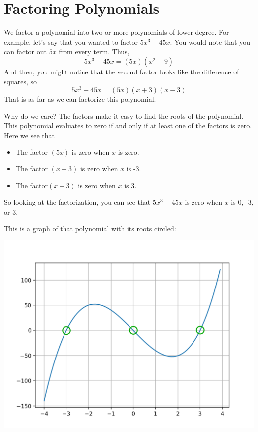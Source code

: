 \chapter{Factoring Polynomials}

We factor a polynomial into two or more polynomials of lower
degree. For example, let's say that you wanted to factor
$5x^3 - 45x$. You would note that you can factor out $5x$ from every term. Thus,
\begin{equation*}
5x^3 - 45x = (5x)(x^2 - 9)
\end{equation*}
And then, you might notice that the second factor looks like the difference of squares, so
\begin{equation*}
5x^3 - 45x = (5x)(x + 3)(x - 3)
\end{equation*}
That is as far as we can factorize this polynomial.

Why do we care? The factors make it easy to find the roots of the
polynomial. This polynomial evaluates to zero if and only if at least
one of the factors is zero. Here we see that
\begin{itemize}
\item The factor $(5x)$ is zero when $x$ is zero.
\item The factor $(x + 3)$ is zero when $x$ is -3.
\item The factor$(x - 3)$ is zero when $x$ is 3.
\end{itemize}
So looking at the factorization, you can see
that $5x^3 - 45x$ is zero when $x$ is 0, -3, or 3. 

This is a graph of that polynomial with its roots circled:

\includegraphics{factor4roots.png}

